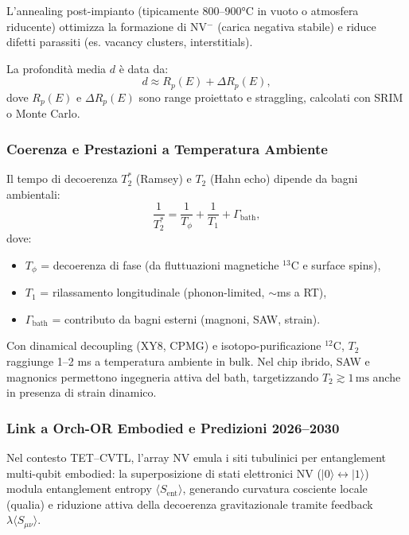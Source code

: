 \documentclass[12pt,a4paper]{article}
\begin{document}
L'annealing post-impianto (tipicamente 800--900°C in vuoto o atmosfera riducente) ottimizza la formazione di NV$^-$ (carica negativa stabile) e riduce difetti parassiti (es. vacancy clusters, interstitials).

La profondità media $d$ è data da:
\begin{equation}
d \approx R_p(E) + \Delta R_p(E),
\label{eq:implant_depth}
\end{equation}
dove $R_p(E)$ e $\Delta R_p(E)$ sono range proiettato e straggling, calcolati con SRIM o Monte Carlo.

\subsubsection{Coerenza e Prestazioni a Temperatura Ambiente}

Il tempo di decoerenza $T_2^*$ (Ramsey) e $T_2$ (Hahn echo) dipende da bagni ambientali:
\begin{equation}
\frac{1}{T_2^*} = \frac{1}{T_{\phi}} + \frac{1}{T_1} + \Gamma_{\mathrm{bath}},
\label{eq:decoherence_rate}
\end{equation}
dove:
\begin{itemize}
    \item $T_{\phi}$ = decoerenza di fase (da fluttuazioni magnetiche $^{13}$C e surface spins),
    \item $T_1$ = rilassamento longitudinale (phonon-limited, $\sim$ms a RT),
    \item $\Gamma_{\mathrm{bath}}$ = contributo da bagni esterni (magnoni, SAW, strain).
\end{itemize}

Con dinamical decoupling (XY8, CPMG) e isotopo-purificazione $^{12}$C, $T_2$ raggiunge 1--2 ms a temperatura ambiente in bulk. Nel chip ibrido, SAW e magnonics permettono ingegneria attiva del bath, targetizzando $T_2 \gtrsim 1\,\mathrm{ms}$ anche in presenza di strain dinamico.

\subsubsection{Link a Orch-OR Embodied e Predizioni 2026--2030}

Nel contesto TET--CVTL, l'array NV emula i siti tubulinici per entanglement multi-qubit embodied: la superposizione di stati elettronici NV ($|0\rangle \leftrightarrow |1\rangle$) modula entanglement entropy $\langle S_{\mathrm{ent}} \rangle$, generando curvatura cosciente locale (qualia) e riduzione attiva della decoerenza gravitazionale tramite feedback $\lambda \langle S_{\mu\nu} \rangle$.
\end{document}
